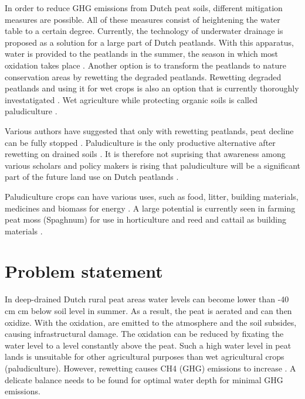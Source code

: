 In order to reduce GHG emissions from Dutch peat soils, different mitigation measures are possible. All of these measures consist of heightening the water table to a certain degree. Currently, the technology of underwater drainage is proposed as a solution for a large part of Dutch peatlands. With this apparatus, water is provided to the peatlands in the summer, the season in which most oxidation takes place \citep{van2011huidige}. Another option is to transform the peatlands to nature conservation areas by rewetting the degraded peatlands. Rewetting degraded peatlands and using it for wet crops is also an option that is currently thoroughly investatigated \citep{Wichmann20151063}. Wet agriculture while protecting organic soils is called paludiculture \citep{joosten2002wise}. 

Various authors have suggested that only with rewetting peatlands, peat decline can be fully stopped \citep{van2016dalende, wichtmann2016paludiculture}. Paludiculture is the only productive alternative after rewetting on drained soils \citep{wichtmann2016paludiculture}. It is therefore not suprising that awareness among various scholars and policy makers is rising that paludiculture will be a significant part of the future land use on Dutch peatlands \citep{abel2013database, wichtmann2016paludiculture, Wichmann20151063}. 

Paludiculture crops can have various uses, such as food, litter, building materials, medicines and biomass for energy \citep{wichtmann2016paludiculture}. A large potential is currently seen in farming peat moss (Spaghnum) for use in horticulture and reed and cattail as building materials \citep{wichtmann2016paludiculture}.

\section{Problem statement}
In deep-drained Dutch rural peat areas water levels can become lower than -40 cm cm below soil level in summer. As a result, the peat is aerated and can then oxidize. With the oxidation,  are emitted to the atmosphere and the soil subsides, causing infrastructural damage. The oxidation can be reduced by fixating the water level to a level constantly above the peat. Such a high water level in peat lands is unsuitable for other agricultural purposes than wet agricultural crops (paludiculture). However, rewetting causes CH4 (GHG) emissions to increase \citep{brouns2016effects}. A delicate balance needs to be found for optimal water depth for minimal GHG emissions. %

